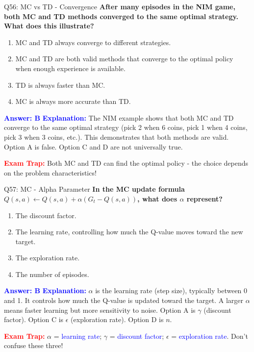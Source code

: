\documentclass[8pt]{beamer}
\begin{document}
	
	\begin{frame}{Q56: MC vs TD - Convergence}
		\fontsize{6.5}{7.5}\selectfont
		\textbf{After many episodes in the NIM game, both MC and TD methods converged to the same optimal strategy. What does this illustrate?}
		
		\begin{enumerate}
			\item MC and TD always converge to different strategies.
			\item MC and TD are both valid methods that converge to the optimal policy when enough experience is available.
			\item TD is always faster than MC.
			\item MC is always more accurate than TD.
		\end{enumerate}
		
		\vspace{0.1cm}
		\textcolor{blue}{\textbf{Answer: B}}
		\vspace{0.1cm}
		\textcolor{blue}{\textbf{Explanation:}} The NIM example shows that both MC and TD converge to the same optimal strategy (pick 2 when 6 coins, pick 1 when 4 coins, pick 3 when 3 coins, etc.). This demonstrates that both methods are valid. Option A is false. Option C and D are not universally true.
		
		\textcolor{red}{\textbf{Exam Trap:}} Both MC and TD can find the optimal policy - the choice depends on the problem characteristics!
	\end{frame}
	
	\begin{frame}{Q57: MC - Alpha Parameter}
		\fontsize{6.5}{7.5}\selectfont
		\textbf{In the MC update formula $Q(s,a) \leftarrow Q(s,a) + \alpha(G_t - Q(s,a))$, what does $\alpha$ represent?}
		
		\begin{enumerate}
			\item The discount factor.
			\item The learning rate, controlling how much the Q-value moves toward the new target.
			\item The exploration rate.
			\item The number of episodes.
		\end{enumerate}
		
		\vspace{0.1cm}
		\textcolor{blue}{\textbf{Answer: B}}
		\vspace{0.1cm}
		\textcolor{blue}{\textbf{Explanation:}} $\alpha$ is the learning rate (step size), typically between 0 and 1. It controls how much the Q-value is updated toward the target. A larger $\alpha$ means faster learning but more sensitivity to noise. Option A is $\gamma$ (discount factor). Option C is $\epsilon$ (exploration rate). Option D is $n$.
		
		\textcolor{red}{\textbf{Exam Trap:}} $\alpha$ = \textcolor{blue}{learning rate}; $\gamma$ = \textcolor{blue}{discount factor}; $\epsilon$ = \textcolor{blue}{exploration rate}. Don't confuse these three!
	\end{frame}
	
\end{document}
